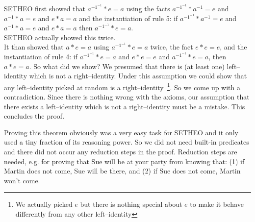 SETHEO first showed that $a^{-1^{-1}} * e = a$ using the facts $a^{-1^{-1}} * a^{-1} =e$ and $a^{-1} * a = e$
and $ e * a = a$ and the instantiation of rule 5: if $a^{-1^{-1}} * a^{-1} =e$ and $a^{-1} * a = e$ and $e * a = a$ then
$a^{-1^{-1}} * e = a$.\\
SETHEO actually showed this twice.\\
It than showed that $a * e = a$ using $a^{-1^{-1}} *e = a$ twice, the fact $e * e = e$, and the instantiation of rule 4:
if $a^{-1^{-1}} * e = a$ and $e * e = e$ and $a^{-1^{-1}} * e = a$, then $a * e = a$.
So what did we show? We presumed that there is (at least one) left--identity
which is not a right--identity. Under this assumption we could show that
any left--identity picked at random is a right--identity~\footnote{We actually
picked $e$ but there is nothing special about $e$ to make it behave
differently from any other left--identity}. So we come up with a 
contradiction. Since there is nothing wrong with the axioms, our assumption 
that there exists a left--identity which is not a right--identity
must be a mistake. This concludes the proof.

Proving this theorem obviously was a very easy task for SETHEO and it only used a tiny fraction of its 
reasoning power. So we did not need built-in predicates and there did not occur any reduction steps in the proof.
Reduction steps are needed, e.g. for proving that Sue will be at your party from knowing that:
(1) if Martin does not come, Sue will be there, and
(2) if Sue does not come, Martin won't come.






%
%
%
%
%
%
%
%
%
%
%
%
%
%
%

